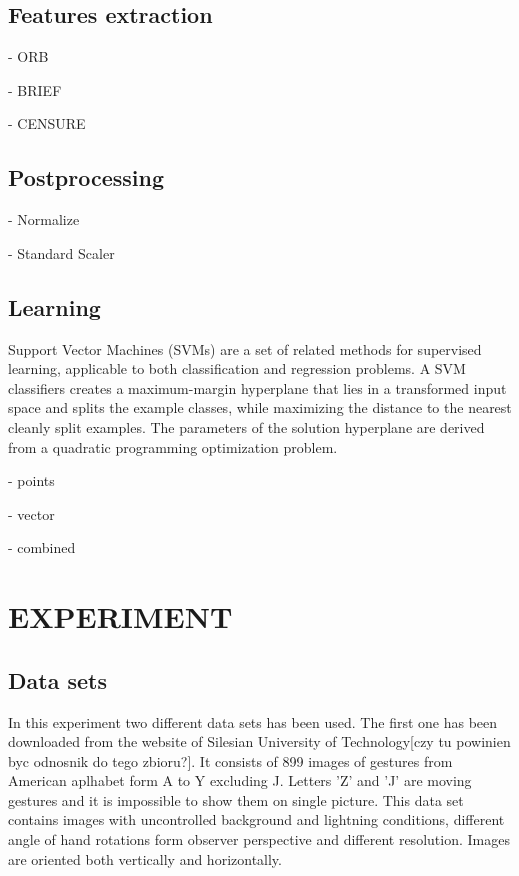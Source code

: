 \documentclass[11pt,a4paper]{article}
\begin{document}
\subsection{Features extraction}

- ORB

- BRIEF

- CENSURE 

\subsection{Postprocessing}

- Normalize

- Standard Scaler 

\subsection{Learning}

Support Vector Machines (SVMs) are a set of related methods for supervised learning, applicable to both classification and regression problems. A SVM classifiers creates a maximum-margin hyperplane that lies in a transformed input space and splits the example classes, while maximizing the distance to the nearest cleanly split examples. The parameters of the solution hyperplane are derived from a quadratic programming optimization problem\cite{SVM1}.

- points

- vector

- combined


\section{EXPERIMENT}

\subsection{Data sets}
	In this experiment two different data sets has been used. The first one has been downloaded from the website of Silesian University of Technology[czy tu powinien byc odnosnik do tego zbioru?]. It consists of 899 images of gestures from American aplhabet form A to Y excluding J. Letters 'Z' and 'J' are moving gestures and it is impossible to show them on single picture. This data set contains images with uncontrolled background and lightning conditions, different angle of hand rotations form observer perspective and different resolution. Images are oriented both vertically and horizontally.
	
\end{document}
